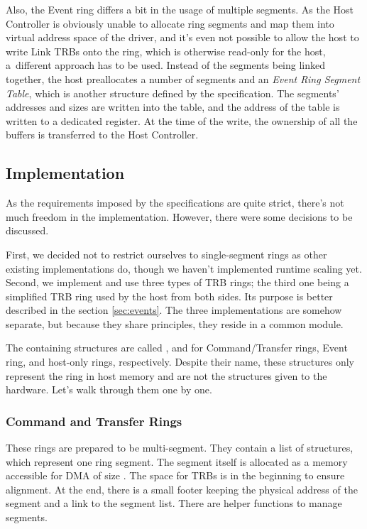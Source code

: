 Also, the Event ring differs a bit in the usage of multiple segments. As the
Host Controller is obviously unable to allocate ring segments and map them into
virtual address space of the driver, and it's even not possible to allow the
host to write Link TRBs onto the ring, which is otherwise read-only for the
host, a~different approach has to be used. Instead of the segments being linked
together, the host preallocates a number of segments and an \emph{Event Ring
Segment Table}, which is another structure defined by the specification. The
segments' addresses and sizes are written into the table, and the address of
the table is written to a dedicated register. At the time of the write, the
ownership of all the buffers is transferred to the Host Controller.

\subsection{Implementation}

As the requirements imposed by the specifications are quite strict, there's not
much freedom in the implementation. However, there were some decisions to be
discussed.

First, we decided not to restrict ourselves to single-segment rings as
other existing implementations do, though we haven't implemented runtime
scaling yet. Second, we implement and use three types of TRB rings;
the third one being a simplified TRB ring used by the host from both sides. Its
purpose is better described in the section \ref{sec:events}. The three
implementations are somehow separate, but because they share principles, they
reside in a common module.

The containing structures are called ,
 and  for Command/Transfer
rings, Event ring, and host-only rings, respectively. Despite their name, these
structures only represent the ring in host memory and are not the structures
given to the hardware. Let's walk through them one by one.

\subsubsection{Command and Transfer Rings}

These rings are prepared to be multi-segment. They contain a list of
 structures, which represent one ring segment. The
segment itself is allocated as a memory accessible for DMA of
size . The space for TRBs is in the beginning to ensure
alignment. At the end, there is a small footer keeping the physical address of
the segment and a link to the segment list. There are helper functions to
manage segments.

